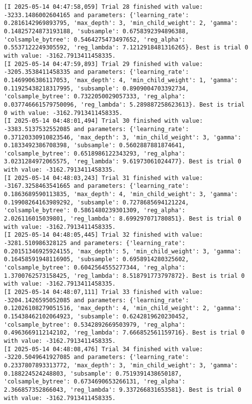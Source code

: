 \documentclass[
  letterpaper,
  DIV=11,
  numbers=noendperiod]{scrreprt}
\begin{document}
\begin{verbatim}
[I 2025-05-14 04:47:58,059] Trial 28 finished with value: -3233.1486002604165 and parameters: {'learning_rate': 0.2816142969893795, 'max_depth': 3, 'min_child_weight': 2, 'gamma': 0.14825724873193188, 'subsample': 0.6758392394896388, 'colsample_bytree': 0.5464275473497652, 'reg_alpha': 0.5537122249305592, 'reg_lambda': 7.1212918481316265}. Best is trial 0 with value: -3162.7913411458335.
[I 2025-05-14 04:47:59,893] Trial 29 finished with value: -3205.3538411458335 and parameters: {'learning_rate': 0.1469906386117053, 'max_depth': 4, 'min_child_weight': 1, 'gamma': 0.11925438218317995, 'subsample': 0.8909004703392734, 'colsample_bytree': 0.7322050029057333, 'reg_alpha': 0.037746661579750096, 'reg_lambda': 5.289887258623613}. Best is trial 0 with value: -3162.7913411458335.
[I 2025-05-14 04:48:01,494] Trial 30 finished with value: -3383.5137532552085 and parameters: {'learning_rate': 0.37120330910823546, 'max_depth': 3, 'min_child_weight': 3, 'gamma': 0.1833492386708398, 'subsample': 0.5602887881874641, 'colsample_bytree': 0.6518986122343293, 'reg_alpha': 3.0231284972065575, 'reg_lambda': 9.61973061024477}. Best is trial 0 with value: -3162.7913411458335.
[I 2025-05-14 04:48:03,243] Trial 31 finished with value: -3167.3258463541665 and parameters: {'learning_rate': 0.1863689590113835, 'max_depth': 4, 'min_child_weight': 3, 'gamma': 0.19908264163989292, 'subsample': 0.7278685694121224, 'colsample_bytree': 0.5861480239301309, 'reg_alpha': 2.026116015039801, 'reg_lambda': 8.699297071780851}. Best is trial 0 with value: -3162.7913411458335.
[I 2025-05-14 04:48:05,445] Trial 32 finished with value: -3281.510986328125 and parameters: {'learning_rate': 0.20151346925924155, 'max_depth': 5, 'min_child_weight': 3, 'gamma': 0.16458591948116905, 'subsample': 0.6958914280325602, 'colsample_bytree': 0.6042564555277344, 'reg_alpha': 1.3700762573158425, 'reg_lambda': 8.518791773797872}. Best is trial 0 with value: -3162.7913411458335.
[I 2025-05-14 04:48:07,111] Trial 33 finished with value: -3204.1426595052085 and parameters: {'learning_rate': 0.12026108279051516, 'max_depth': 4, 'min_child_weight': 2, 'gamma': 0.15438462102064923, 'subsample': 0.6242819620230452, 'colsample_bytree': 0.5342892669503979, 'reg_alpha': 0.4963669112142102, 'reg_lambda': 7.666852561159716}. Best is trial 0 with value: -3162.7913411458335.
[I 2025-05-14 04:48:08,476] Trial 34 finished with value: -3220.5049641927085 and parameters: {'learning_rate': 0.2337807893313772, 'max_depth': 3, 'min_child_weight': 3, 'gamma': 0.188224524248803, 'subsample': 0.7519391438650187, 'colsample_bytree': 0.6734690653266131, 'reg_alpha': 2.366857352866043, 'reg_lambda': 9.337266831653581}. Best is trial 0 with value: -3162.7913411458335.

\end{verbatim}
\end{document}
